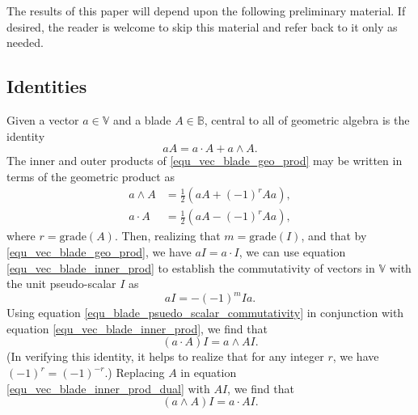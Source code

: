 \documentclass{birkjour}
\theoremstyle{definition}
\theoremstyle{remark}
\numberwithin{equation}{section}
\newcommand{\B}{\mathbb{B}}
\newcommand{\V}{\mathbb{V}}
\newcommand{\grade}{\mbox{grade}}
\begin{document}
The results of this paper will depend upon the following preliminary material.
If desired, the reader is welcome to skip this material and refer back to it only as needed.

\subsection{Identities}

Given a vector $a\in\V$ and a blade $A\in\B$, central to all of geometric algebra is the identity
\begin{equation}\label{equ_vec_blade_geo_prod}
aA = a\cdot A + a\wedge A.
\end{equation}
The inner and outer products of \eqref{equ_vec_blade_geo_prod} may be written in terms
of the geometric product as
\begin{align}
a\wedge A &= \frac{1}{2}\left(aA + (-1)^rAa\right),\label{equ_vec_blade_outer_prod} \\
a\cdot A &= \frac{1}{2}\left(aA - (-1)^rAa\right),\label{equ_vec_blade_inner_prod}
\end{align}
where $r=\grade(A)$.  Then, realizing that $m=\grade(I)$, and that by \eqref{equ_vec_blade_geo_prod},
we have $aI=a\cdot I$, we can use equation \eqref{equ_vec_blade_inner_prod} to establish the
commutativity of vectors in $\V$ with the unit pseudo-scalar $I$ as
\begin{equation}\label{equ_blade_psuedo_scalar_commutativity}
aI = -(-1)^mIa.
\end{equation}
Using equation \eqref{equ_blade_psuedo_scalar_commutativity} in conjunction with equation \eqref{equ_vec_blade_inner_prod},
we find that
\begin{equation}\label{equ_vec_blade_inner_prod_dual}
(a\cdot A)I=a\wedge AI.
\end{equation}
(In verifying this identity, it helps to realize that for any integer $r$, we have $(-1)^r=(-1)^{-r}$.)
Replacing $A$ in equation \eqref{equ_vec_blade_inner_prod_dual} with $AI$, we find that
\begin{equation}\label{equ_vec_blade_outer_prod_dual}
(a\wedge A)I=a\cdot AI.
\end{equation}
\end{document}

